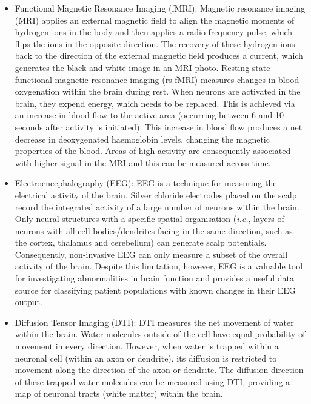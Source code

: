 \begin{itemize}
	\item Functional Magnetic Resonance Imaging (fMRI): Magnetic resonance imaging (MRI) applies an external magnetic field to align the magnetic moments of hydrogen ions in the body and then applies a radio frequency pulse, which flips the ions in the opposite direction. The recovery of these hydrogen ions back to the direction of the external magnetic field produces a current, which generates the black and white image in an MRI photo. Resting state functional magnetic resonance imaging (rs-fMRI) measures changes in blood oxygenation within the brain during rest. When neurons are activated in the brain, they expend energy, which needs to be replaced. This is achieved via an increase in blood flow to the active area (occurring between 6 and 10 seconds after activity is initiated). This increase in blood flow produces a net decrease in deoxygenated haemoglobin levels, changing the magnetic properties of the blood. Areas of high activity are consequently associated with higher signal in the MRI and this can be measured across time.
	\item Electroencephalography (EEG): EEG is a technique for measuring the electrical activity of the brain. Silver chloride electrodes placed on the scalp record the integrated activity of a large number of neurons within the brain. Only neural structures with a specific spatial organisation (\emph{i.e.}, layers of neurons with all cell bodies/dendrites facing in the same direction, such as the cortex, thalamus and cerebellum) can generate scalp potentials. Consequently, non-invasive EEG can only measure a subset of the overall activity of the brain. Despite this limitation, however, EEG is a valuable tool for investigating abnormalities in brain function and provides a useful data source for classifying patient populations with known changes in their EEG output.
	\item Diffusion Tensor Imaging (DTI): DTI measures the net movement of water within the brain. Water molecules outside of the cell have equal probability of movement in every direction. However, when water is trapped within a neuronal cell (within an axon or dendrite), its diffusion is restricted to movement along the direction of the axon or dendrite. The diffusion direction of these trapped water molecules can be measured using DTI, providing a map of neuronal tracts (white matter) within the brain.
	
\end{itemize}


